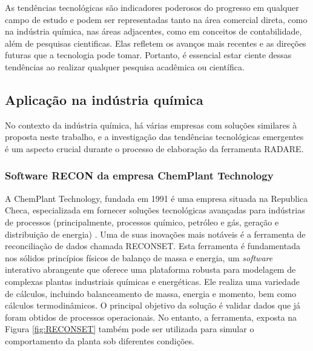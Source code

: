 As tendências tecnológicas são indicadores poderosos do progresso em qualquer campo de estudo e podem ser representadas tanto na área comercial direta, como na indústria química, nas áreas adjacentes, como em conceitos de contabilidade, além de pesquisas cientificas. Elas refletem os avanços mais recentes e as direções futuras que a tecnologia pode tomar. Portanto, é essencial estar ciente dessas tendências ao realizar qualquer pesquisa acadêmica ou científica.

\subsection{Aplicação na indústria química}

No contexto da indústria química, há várias empresas com soluções similares à proposta neste trabalho, e a investigação das tendências tecnológicas emergentes é um aspecto crucial durante o processo de elaboração da ferramenta RADARE.

\subsubsection{Software RECON da empresa ChemPlant Technology}

A ChemPlant Technology, fundada em 1991 é uma empresa situada na Republica Checa, especializada em fornecer soluções tecnológicas avançadas para indústrias de processos (principalmente, processos químico, petróleo e gás, geração e distribuição de energia) \cite{reconset}. Uma de suas inovações mais notáveis é a ferramenta de reconciliação de dados chamada RECONSET. Esta ferramenta é fundamentada nos sólidos princípios físicos de balanço de massa e energia, um \textit{software} interativo abrangente que oferece uma plataforma robusta para modelagem de complexas plantas industriais químicas e energéticas. Ele realiza uma variedade de cálculos, incluindo balanceamento de massa, energia e momento, bem como cálculos termodinâmicos. O principal objetivo da solução é validar dados que já foram obtidos de processos operacionais. No entanto, a ferramenta, exposta na Figura \ref{fig:RECONSET} também pode ser utilizada para simular o comportamento da planta sob diferentes condições.

